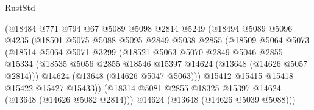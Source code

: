 \begin{lexlean}{RustStd}
\begin{coremodule}
                              (@18484
                                @771
                                @794
                                @67
                                @5089
                                @5098
                                @2814
                                @5249
                                (@18494
                                  @5089
                                  @5096
                                  @4235
                                  (@18501
                                    @5075
                                    @5088
                                    @5095
                                    @2849
                                    @5038
                                    @2855
                                    (@18509
                                      @5064
                                      @5073
                                      (@18514
                                        @5064
                                        @5071
                                        @3299
                                        (@18521
                                          @5063
                                          @5070
                                          @2849
                                          @5046
                                          @2855
                                          @15334
                                          (@18535
                                            @5056
                                            @2855
                                            @18546
                                            @15397
                                            @14624
                                            (@13648 (@14626 @5057 @2814)))
                                          @14624
                                          (@13648 (@14626 @5047 @5063)))
                                        @15412
                                        @15415
                                        @15418
                                        @15422
                                        @15427
                                        @15433))
                                    (@18314
                                      @5081
                                      @2855
                                      @18325
                                      @15397
                                      @14624
                                      (@13648 (@14626 @5082 @2814)))
                                    @14624
                                    (@13648 (@14626 @5039 @5088)))

\end{coremodule}
\end{lexlean}
